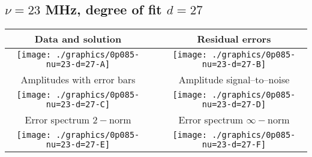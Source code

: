 

% 

\clearpage{}
\break{}

\subsection{$\nu = 23$ MHz, degree of fit $d = 27$}

\begin{table}[h]
    \begin{center}
        \begin{tabular}{ccc}
            Data and solution & \quad & Residual errors \\\hline
            \texttt{[image: ./graphics/0p085-nu=23-d=27-A]} &&
            \texttt{[image: ./graphics/0p085-nu=23-d=27-B]} \\[15pt]
            Amplitudes with error bars && Amplitude signal--to--noise \\\hline
            \texttt{[image: ./graphics/0p085-nu=23-d=27-C]} &&
            \texttt{[image: ./graphics/0p085-nu=23-d=27-D]} \\[15pt]
            Error spectrum $2-$norm && Error spectrum $\infty-$norm \\\hline
            \texttt{[image: ./graphics/0p085-nu=23-d=27-E]} &&
            \texttt{[image: ./graphics/0p085-nu=23-d=27-F]} \\[15pt]
        \end{tabular}
    \end{center}
\label{fig:elev=85, nu=23}
\end{table}



\endinput
